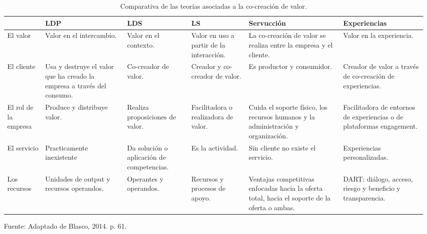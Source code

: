 \begin{landscape}
\begin{table}[h]
    \caption {Comparativa de las teorías asociadas a la co-creación de valor.}
	\label{tab:comparativaTeorias}
	\setlength\extrarowheight{5pt}
	
	\begin{tabular}{p{1.8cm} p{3.8cm} p{3.8cm} p{3.8cm} p{3.8cm} p{3.8cm} }
	\toprule
		                 & LDP                                                                      & LDS                                       & LS                                       & Servucción                                                                                    & Experiencias                                                          \\ \midrule
	El valor             & Valor en el intercambio.                                                 & Valor en el contexto.                     & Valor en uso a partir de la interacción. & La co-creación de valor se realiza entre la empresa y el cliente.                             & Valor en la experiencia.                                              \\
	El cliente           & Usa y destruye el valor que ha creado la empresa a través del consumo. & Co-creador de valor.                      & Creador y co-creador de valor.           & Es productor y consumidor.                                                                    & Creador de valor a través de co-creación de experiencias.             \\
	El rol de la empresa & Produce y distribuye valor.                                              & Realiza proposiciones de valor.           & Facilitadora o realizadora de valor.     & Cuida el soporte físico, los recursos humanos y la administración y organización.             & Facilitadora de entornos de experiencias o de plataformas engagement. \\
	El servicio          & Practicamente inexistente                                                & Da solución o aplicación de competencias. & Es la actividad.                         & Sin cliente no existe el servicio.                                                            & Experiencias personalizadas.                                          \\
	Los recursos         & Unidades de output y recursos operandos.                                 & Operantes y operandos.                    & Recursos y procesos de apoyo.            & Ventajas competitivas enfocadas hacia la oferta total, hacia el soporte de la oferta o ambas. & DART: diálogo, acceso, riesgo y beneficio y transparencia.            \\ \bottomrule
	\end{tabular}

	\center
	\footnotesize
	Fuente: Adaptado de Blasco, 2014. p. 61.
\end{table}
\end{landscape}
